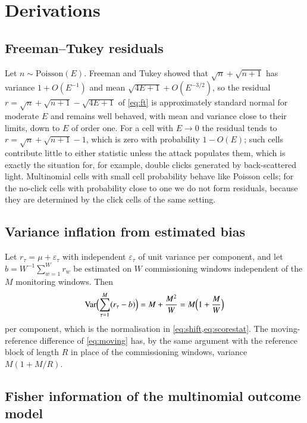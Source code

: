 \section{Derivations}\label{app:derivations}

\subsection{Freeman--Tukey residuals}\label{app:ft}

Let $n\sim\mathrm{Poisson}(E)$. Freeman and Tukey \cite{FreemanTukey1950} showed that $\sqrt{n}+\sqrt{n+1}$ has variance $1+O(E^{-1})$ and mean $\sqrt{4E+1}+O(E^{-3/2})$, so the residual $r=\sqrt{n}+\sqrt{n+1}-\sqrt{4E+1}$ of \cref{eq:ft} is approximately standard normal for moderate $E$ and remains well behaved, with mean and variance close to their limits, down to $E$ of order one. For a cell with $E\to0$ the residual tends to $r=\sqrt{n}+\sqrt{n+1}-1$, which is zero with probability $1-O(E)$; such cells contribute little to either statistic unless the attack populates them, which is exactly the situation for, for example, double clicks generated by back-scattered light. Multinomial cells with small cell probability behave like Poisson cells; for the no-click cells with probability close to one we do not form residuals, because they are determined by the click cells of the same setting.

\subsection{Variance inflation from estimated bias}\label{app:inflation}

Let $r_\tau=\mu+\varepsilon_\tau$ with independent $\varepsilon_\tau$ of unit variance per component, and let $b=W^{-1}\sum_{w=1}^W r_w$ be estimated on $W$ commissioning windows independent of the $M$ monitoring windows. Then
\begin{equation}
\mathrm{Var}\Bigl(\sum_{\tau=1}^M (r_\tau-b)\Bigr)=M+\frac{M^2}{W}=M\Bigl(1+\frac{M}{W}\Bigr)
\end{equation}
per component, which is the normalisation in \cref{eq:shift,eq:scorestat}. The moving-reference difference of \cref{eq:moving} has, by the same argument with the reference block of length $R$ in place of the commissioning windows, variance $M(1+M/R)$.

\subsection{Fisher information of the multinomial outcome model}\label{app:fisher}

